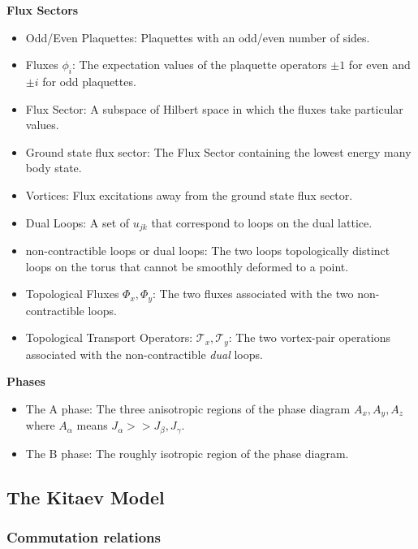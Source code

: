 \textbf{Flux Sectors}

\begin{itemize}
\item
  Odd/Even Plaquettes: Plaquettes with an odd/even number of sides.
\item
  Fluxes \(\phi_i\): The expectation values of the plaquette operators \(\pm 1\) for even and \(\pm i\) for odd plaquettes.
\item
  Flux Sector: A subspace of Hilbert space in which the fluxes take particular values.
\item
  Ground state flux sector: The Flux Sector containing the lowest energy many body state.
\item
  Vortices: Flux excitations away from the ground state flux sector.
\item
  Dual Loops: A set of \(u_{jk}\) that correspond to loops on the dual lattice.
\item
  non-contractible loops or dual loops: The two loops topologically distinct loops on the torus that cannot be smoothly deformed to a point.
\item
  Topological Fluxes \(\Phi_{x}, \Phi_{y}\): The two fluxes associated with the two non-contractible loops.
\item
  Topological Transport Operators: \(\mathcal{T}_{x}, \mathcal{T}_{y}\): The two vortex-pair operations associated with the non-contractible \emph{dual} loops.
\end{itemize}

\textbf{Phases}

\begin{itemize}
\tightlist
\item
  The A phase: The three anisotropic regions of the phase diagram \(A_x, A_y, A_z\) where \(A_\alpha\) means \(J_\alpha >> J_\beta, J_\gamma\).
\item
  The B phase: The roughly isotropic region of the phase diagram.
\end{itemize}

\hypertarget{the-kitaev-model}{%
\subsection{The Kitaev Model}\label{the-kitaev-model}}

\hypertarget{commutation-relations}{%
\subsubsection{Commutation relations}\label{commutation-relations}}

